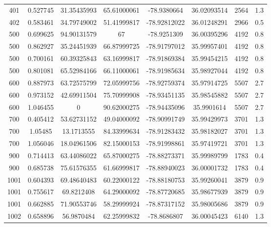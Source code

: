 \documentclass[11pt]{article}
\begin{document}
\begin{longtable*}{|c|c|c|c|c|c|c|c|}
401   & 0.527745       & 31.35435993       & 65.61000061    & -78.9380664  & 36.02093514 & 2564       & 1.3  \\
402   & 0.583461       & 34.79749002       & 51.41999817    & -78.92812022 & 36.01248291 & 2966       & 0.5  \\
500   & 0.699625       & 94.90131579       & 67             & -78.9251309  & 36.00395296 & 4192       & 0.8  \\
500   & 0.862927       & 35.24451939       & 66.87999725    & -78.91797012 & 35.99957401 & 4192       & 0.8  \\
500   & 0.700161       & 60.39325843       & 63.16999817    & -78.91869384 & 35.99454215 & 4192       & 0.8  \\
500   & 0.801081       & 65.52984166       & 66.11000061    & -78.91985634 & 35.98927044 & 4192       & 0.8  \\
600   & 0.887973       & 63.72575799       & 72.05999756    & -78.92759374 & 35.97914725 & 5507       & 2.7  \\
600   & 0.973152       & 42.69911504       & 75.70999908    & -78.93451135 & 35.98545882 & 5507       & 2.7  \\
600   & 1.046455       & 0                 & 90.62000275    & -78.94435096 & 35.9901614  & 5507       & 2.7  \\
700   & 0.405412       & 53.62731152       & 49.04000092    & -78.90991749 & 35.99429973 & 3701       & 1.3  \\
700   & 1.05485        & 13.1713555        & 84.33999634    & -78.91283432 & 35.98182027 & 3701       & 1.3  \\
700   & 1.056046       & 18.04961506       & 82.15000153    & -78.91998861 & 35.97419721 & 3701       & 1.3  \\
900   & 0.714413       & 63.44086022       & 65.87000275    & -78.88273371 & 35.99989799 & 1783       & 0.4  \\
900   & 0.685738       & 75.61576355       & 61.66999817    & -78.88940023 & 36.00001732 & 1783       & 0.4  \\
1001  & 0.604393       & 69.48640483       & 60.22000122    & -78.88180753 & 35.99260041 & 3879       & 0.9  \\
1001  & 0.755617       & 69.8212408        & 64.29000092    & -78.87720685 & 35.98677939 & 3879       & 0.9  \\
1001  & 0.662885       & 71.90553746       & 58.29999924    & -78.87317152 & 35.98005686 & 3879       & 0.9  \\
1002  & 0.658896       & 56.9870484        & 62.25999832    & -78.8686807  & 36.00045423 & 6140       & 1.3  \\

\end{longtable*}
\end{document}

